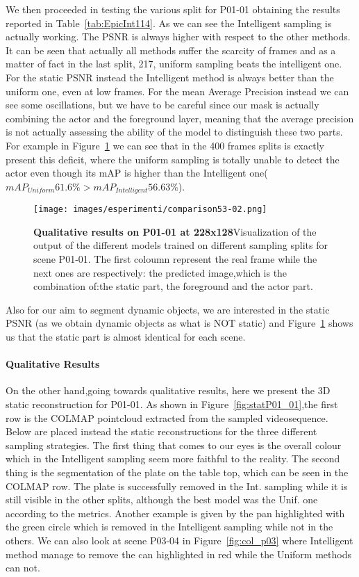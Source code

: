 We then proceeded in testing the various split for P01-01 obtaining the results reported in Table~\ref{tab:EpicInt114}.
As we can see the Intelligent sampling is actually working. The PSNR is always higher with respect to the other methods.
It can be seen that actually all methods suffer the scarcity of frames and as a matter of fact in the last split, 217, 
uniform sampling beats the intelligent one. For the static PSNR instead the Intelligent method is always better
than the uniform one, even at low frames. For the mean Average Precision instead we can see some oscillations,
but we have to be careful since our mask is actually combining the actor and the foreground layer, meaning that 
the average precision is not actually assessing the ability of the model to distinguish these two parts. 
For example in Figure~\ref{fig:comp} we can see that in the 400 frames splits is exactly present this deficit, where the 
uniform sampling is totally unable to detect the actor even though its mAP is higher than the Intelligent 
one($mAP_{Uniform}61.6\% > mAP_{Intelligent}56.63\%$).
\begin{figure}[H]
    \hspace{-2cm}
    \centering
    \texttt{[image: images/esperimenti/comparison53-02.png]} 
    \caption{\textbf{Qualitative results on P01-01 at 228x128}Visualization of the output of the different models trained on different
    sampling splits for scene P01-01. The first coloumn represent the real frame while the next ones
    are respectively: the predicted image,which is the combination of:the static part, the foreground and the actor part.}\label{fig:comp}
\end{figure}
Also for our aim to segment dynamic objects, we are interested in the static PSNR (as we obtain dynamic objects as 
what is NOT static) and Figure~\ref{fig:comp} shows us that the static part is almost identical for each scene.




\paragraph{Qualitative Results}On the other hand,going towards qualitative results, here we present the 3D static reconstruction for P01-01.
As shown in Figure~\ref{fig:statP01_01},the first row is the COLMAP pointcloud extracted from the sampled videosequence. Below are placed
instead the static reconstructions for the three different sampling strategies. The first thing that comes to our eyes is 
the overall colour which in the Intelligent sampling seem more faithful to the reality. The second thing is the segmentation of 
the plate on the table top, which can be seen in the COLMAP row. The plate is successfully removed in the Int. sampling while
it is still visible in the other splits, although the best model was the Unif. one according to the metrics. Another example 
is given by the pan highlighted with the green circle which is removed in the Intelligent sampling while not in the others.
We can also look at scene P03-04 in Figure~\ref{fig:col_p03} where Intelligent method manage to remove the can highlighted
in red while the Uniform methods can not.

